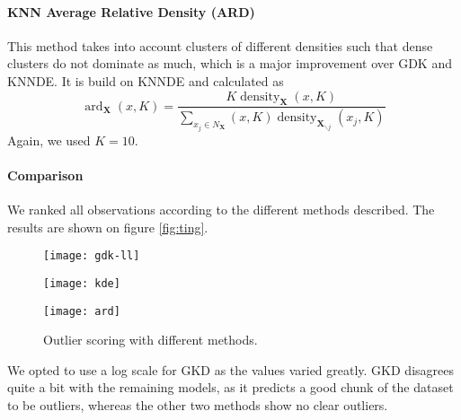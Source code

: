 \paragraph{KNN Average Relative Density (ARD)}
This method takes into account clusters of different densities such that dense clusters do not dominate as much, which is a major improvement over GDK and KNNDE.
It is build on KNNDE and calculated as
\begin{equation*}
	\operatorname{ard}_{\mathbf X}(x, K)=\frac{K\operatorname{density}_{\mathbf X}(x, K)}{\sum_{x_j \in N_{\mathbf X}}(x, K)\operatorname{density}_{\mathbf X_{\backslash j}}(x_j, K)}
\end{equation*}
Again, we used $ K=10 $.

\paragraph{Comparison}
We ranked all observations according to the different methods described. The results are shown on figure \eqref{fig:ting}.
\begin{figure}[H]
	\centering
	\begin{minipage}[t]{.3\textwidth}
		\texttt{[image: gdk-ll]}
	\end{minipage}\hfill
	\begin{minipage}[t]{.3\textwidth}
		\texttt{[image: kde]}
	\end{minipage}\hfill
	\begin{minipage}[t]{.3\textwidth}
		\texttt{[image: ard]}
	\end{minipage}\hfill
	\caption{Outlier scoring with different methods.}\label{fig:ting}
\end{figure}\noindent
We opted to use a log scale for GKD as the values varied greatly.
GKD disagrees quite a bit with the remaining models, as it predicts a good chunk of the dataset to be outliers, whereas the other two methods show no clear outliers.














